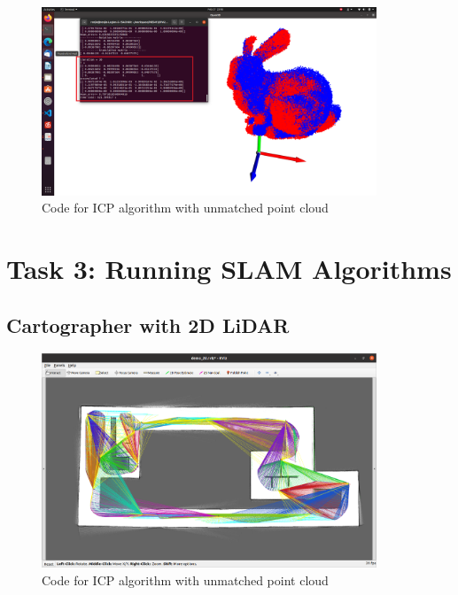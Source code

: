 \documentclass[hyperref]{article}
\theoremstyle{nonumberplain}
\begin{document}
\begin{figure}[H]
	\centering
	\includegraphics[width=10cm]{2.3.png}
	\caption{Code for ICP algorithm with unmatched point cloud}
	\label{fig4}
\end{figure}






\section{Task 3: Running SLAM Algorithms}

\subsection{Cartographer with 2D LiDAR}

\hspace{1.0em}


\begin{figure}[H]
	\centering
	\includegraphics[width=10cm]{task3a_result.png}
	\caption{Code for ICP algorithm with unmatched point cloud}
	\label{fig5}
\end{figure}
\end{document}
